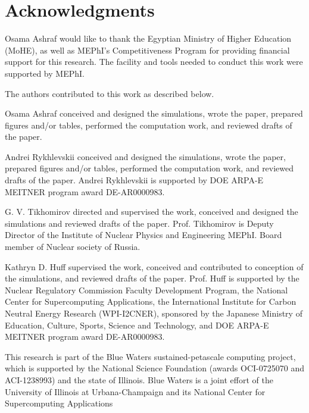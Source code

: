 \section{Acknowledgments}

Osama Ashraf would like to thank the Egyptian Ministry of Higher Education (MoHE), as well as MEPhI's Competitiveness Program for providing financial support for this research. The facility and tools needed to conduct this work were supported by MEPhI.

The authors contributed to this work as described below.

Osama Ashraf conceived and designed the simulations, wrote the paper, prepared figures 
and/or tables, performed the computation work, and reviewed drafts of the paper.

Andrei Rykhlevskii conceived and designed the simulations, wrote the paper, prepared figures 
and/or tables, performed the computation work, and reviewed drafts of the paper. Andrei Rykhlevskii 
is supported by  DOE ARPA-E MEITNER program award DE-AR0000983. 

G. V. Tikhomirov directed and supervised the work, conceived and designed the simulations and reviewed drafts of the paper. Prof. Tikhomirov is Deputy Director of the Institute of Nuclear Physics and Engineering MEPhI. Board member of Nuclear society of Russia.

Kathryn D. Huff supervised the work, conceived and contributed to conception of the simulations, and reviewed drafts of the paper.  Prof. Huff is supported by the Nuclear Regulatory Commission Faculty Development Program, the National Center for Supercomputing Applications, the International Institute for Carbon Neutral Energy Research (WPI-I2CNER), 
sponsored by the Japanese Ministry of Education, Culture, Sports, Science and Technology, and  DOE ARPA-E MEITNER program award DE-AR0000983.

This research is part of the Blue Waters sustained-petascale computing project, 
which is supported by the National Science Foundation (awards OCI-0725070 and 
ACI-1238993) and the state of Illinois. Blue Waters is a joint effort of the 
University of Illinois at Urbana-Champaign and its National Center for 
Supercomputing Applications 
